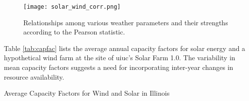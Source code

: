 \begin{figure}[H]
  \centering
  \texttt{[image: solar\_wind\_corr.png]}
  \caption{Relationships among various weather parameters and their strengths
  according to the Pearson statistic.}
  \label{fig:solar-wind-corr}
\end{figure}

Table \ref{tab:capfac} lists the average annual capacity factors for solar energy
and a hypothetical wind farm at the site of \gls{uiuc}'s Solar Farm 1.0. The
variability in mean capacity factors suggests a need for incorporating inter-year
changes in resource availability.

\begin{table}[H]
  \centering
  \caption{Average Capacity Factors for Wind and Solar in Illinois}
  \label{tab:capfac}
  
\end{table}
